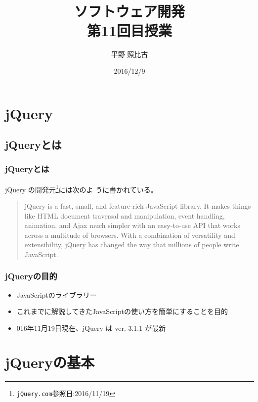 
\title{ソフトウェア開発\\第11回目授業}
\author{平野 照比古}
\institute{}
\date{2016/12/9}
\newtheorem{Prob}{解説}
\newcommand{\Elm}[1]{\texttt{<#1>}}

\newcommand{\DOMM}{\texttt}
\newcommand{\Event}{\texttt}
\newcommand{\DOMP}{\texttt}
\newcommand{\DOM}{\texttt{DOM}}
\newcommand{\keyitem}{\relax}
\newcommand{\HTML}{HTML文書}

\frame{\maketitle}
\section{jQuery}
\subsection{jQueryとは}
\begin{frame}[containsverbatim]
\frametitle{jQueryとは}
jQuery の開発元\footnote{\texttt{jQuery.com}参照日:2016/11/19}には次のよ
 うに書かれている。
\begin{quotation}
jQuery is a fast, small, and feature-rich JavaScript library. It makes
 things like HTML document traversal and manipulation, event handling,
 animation, and Ajax much simpler with an easy-to-use API that works
 across a multitude of browsers. With a combination of versatility and
 extensibility, jQuery has changed the way that millions of people write
 JavaScript.
\end{quotation}
\end{frame}
\begin{frame}[containsverbatim]
\frametitle{jQueryの目的}
\begin{itemize}
 \item JavaScriptのライブラリー
 \item これまでに解説してきたJavaScriptの使い方を簡単にすることを目的
 \item 016年11月19日現在、jQuery は ver. 3.1.1 が最新
\end{itemize}
\end{frame}
\newcommand{\FuncRef}[1]{%
\refstepcounter{Func}\label{#1}({\bfseries 機能\arabic{Func}})}
\section{jQueryの基本}
